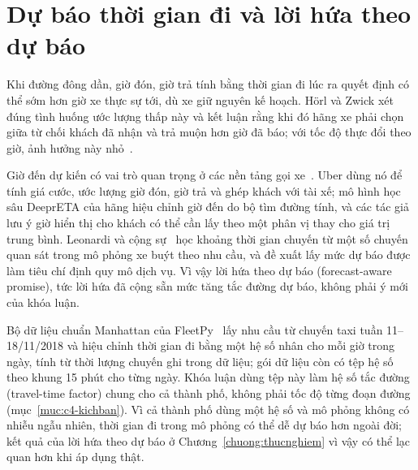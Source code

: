 \section{Dự báo thời gian đi và lời hứa theo dự báo}
\label{muc:c2-dubao}

Khi đường đông dần, giờ đón, giờ trả tính bằng thời gian đi lúc ra quyết định có thể sớm hơn giờ xe thực sự tới, dù
xe giữ nguyên kế hoạch. Hörl và Zwick xét đúng tình huống ước lượng thấp này và kết luận rằng khi đó hãng xe phải chọn
giữa từ chối khách đã nhận và trả muộn hơn giờ đã báo; với tốc độ thực đổi theo giờ, ảnh hưởng này nhỏ~\cite{horl2022}.

Giờ đến dự kiến có vai trò quan trọng ở các nền tảng gọi xe~\cite{hu2022}. Uber dùng nó để tính giá cước, ước lượng
giờ đón, giờ trả và ghép khách với tài xế; mô hình học sâu DeeprETA của hãng hiệu chỉnh giờ đến do bộ tìm đường tính,
và các tác giả lưu ý giờ hiển thị cho khách có thể cần lấy theo một phân vị thay cho giá trị trung bình. Leonardi và
cộng sự~\cite{leonardi2024} học khoảng thời gian chuyến từ một số chuyến quan sát trong mô phỏng xe buýt theo nhu cầu,
và đề xuất lấy mức dự báo được làm tiêu chí định quy mô dịch vụ. Vì vậy lời hứa theo dự báo
(forecast-aware promise), tức lời hứa đã cộng sẵn mức tăng tắc đường dự báo, không phải ý mới của khóa luận.

Bộ dữ liệu chuẩn Manhattan của FleetPy~\cite{engelhardt2026} lấy nhu cầu từ chuyến taxi tuần 11--18/11/2018 và hiệu
chỉnh thời gian đi bằng một hệ số nhân cho mỗi giờ trong ngày, tính từ thời lượng chuyến ghi trong dữ liệu; gói dữ
liệu còn có tệp hệ số theo khung 15 phút cho từng ngày. Khóa luận dùng tệp này làm hệ số tắc đường (travel-time
factor) chung cho cả thành phố, không phải tốc độ từng đoạn đường (mục~\ref{muc:c4-kichban}). Vì cả thành phố dùng
một hệ số và mô phỏng không có nhiễu ngẫu nhiên, thời gian đi trong mô phỏng có thể dễ dự báo hơn ngoài đời; kết quả
của lời hứa theo dự báo ở Chương~\ref{chuong:thucnghiem} vì vậy có thể lạc quan hơn khi áp dụng thật.

